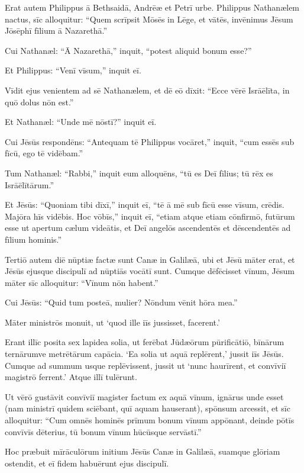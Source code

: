 \Versus Erat autem Philippus ā Bethsaidā, Andrēæ et Petrī urbe.
\Versus Philippus Nathanælem nactus, sīc alloquitur: ``Quem scrīpsit Mōsēs in Lēge, et vātēs, invēnimus Jēsum Jōsēphī fīlium ā Nazarethā.''

\Versus Cui Nathanæl: ``Ā Nazarethā,'' inquit, ``potest aliquid bonum esse?''

Et Philippus: ``Venī vīsum,'' inquit eī.

\Versus Vīdit ejus venientem ad sē Nathanælem, et dē eō dīxit: ``Ecce vērē Isrāēlīta, in quō dolus nōn est.''

\Versus Et Nathanæl: ``Unde mē nōstī?'' inquit eī.

Cui Jēsūs respondēns: ``Antequam tē Philippus vocāret,'' inquit, ``cum essēs sub fīcū, ego tē vidēbam.''

\Versus Tum Nathanæl: ``Rabbi,'' inquit eum alloquēns, ``tū es Deī fīlius; tū rēx es Isrāēlī\-tārum.''

\Versus Et Jēsūs: ``Quoniam tibi dīxī,'' inquit eī, ``tē ā mē sub fīcū esse vīsum, crēdis. Majōra hīs vidēbis.
\Versus Hoc vōbīs,'' inquit eī, ``etiam atque etiam cōnfirmō, futūrum esse ut apertum cælum videātis, et Deī angelōs ascendentēs et dēscendentēs ad fīlium hominis.''


\Caput
\Versus Tertiō autem diē nūptiæ factæ sunt Canæ in Galilæā, ubi et Jēsū māter erat,
\Versus et Jēsūs ejusque discipulī ad nūptiās vocātī sunt.
\Versus Cumque dēfēcisset vīnum, Jēsum māter sīc alloquitur: ``Vīnum nōn habent.''

\Versus Cui Jēsūs: ``Quid tum posteā, mulier? Nōndum vēnit hōra mea.''

\Versus Māter ministrōs monuit, ut `quod ille iīs jussisset, facerent.'

\Versus Erant illīc posita sex lapidea solia, ut ferēbat Jūdæōrum pūrificātiō, bīnārum ternārumve metrētārum capācia.
\Versus `Ea solia ut aquā replērent,' jussit iīs Jēsūs. Cumque ad summum usque replēvissent,
\Versus jussit ut `nunc haurīrent, et convīviī magistrō ferrent.' Atque illī tulērunt.

\Versus Ut vērō gustāvit convīviī magister factum ex aquā vīnum, ignārus unde esset (nam ministrī quidem sciēbant, quī aquam hauserant), spōnsum arcessit,
\Versus et sīc alloquitur: ``Cum omnēs hominēs prīmum bonum vīnum appōnant, deinde pōtīs convīvīs dēterius, tū bonum vīnum hūcūsque servāstī.''

\Versus Hoc præbuit mīrāculōrum initium Jēsūs Canæ in Galilæā, suamque glōriam ostendit, et eī fidem habuērunt ejus discipulī.

